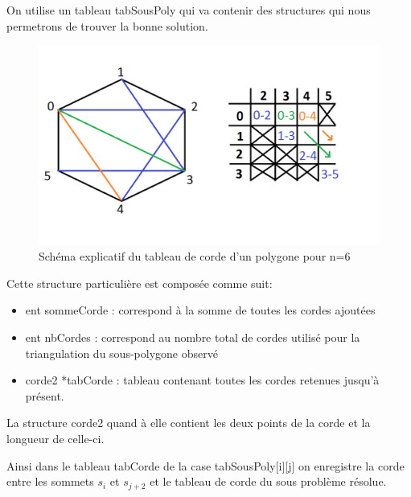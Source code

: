 \documentclass[a4paper,10pt]{article}
\begin{document}
On utilise un tableau tabSousPoly qui va contenir des structures qui nous permetrons de trouver la bonne solution.

\begin{figure}[h!]
\begin{center}
\includegraphics[scale=0.3]{schema1.png}
\caption{Schéma explicatif du tableau de corde d'un polygone pour n=6}
\end{center}
\end{figure}

Cette structure particulière est composée comme suit:
\begin{itemize}
 \item ent sommeCorde : correspond à la somme de toutes les cordes ajoutées
 \item ent nbCordes : correspond au nombre total de cordes utilisé pour la triangulation du sous-polygone observé
 \item corde2 *tabCorde : tableau contenant toutes les cordes retenues jusqu'à présent.
\end{itemize}

La structure corde2 quand à elle contient les deux points de la corde et la longueur de celle-ci.

Ainsi dans le tableau tabCorde de la case tabSousPoly[i][j] on enregistre la corde entre les sommets \(s_i\) et \(s_{j+2}\) et le tableau de  corde du sous problème résolue.
  
\end{document}
